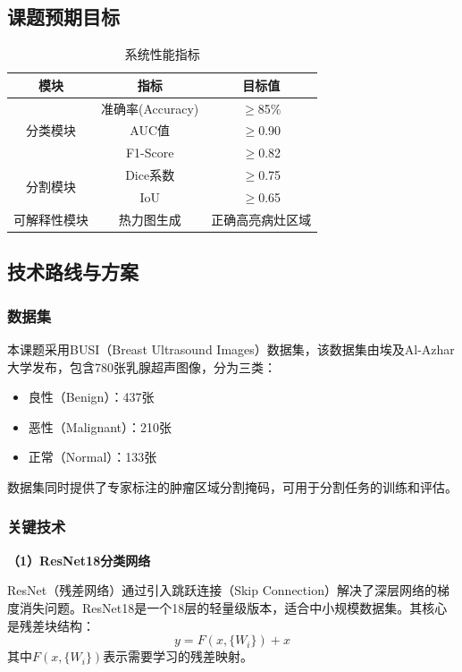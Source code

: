 \documentclass[supercite]{Hust-undergraduate-kaiti}
\theoremstyle{definition}
\begin{document}
\subsection{课题预期目标}

\begin{table}[htb]
\centering
\caption{系统性能指标}
\begin{tabular}{|c|c|c|}
\hline
\textbf{模块} & \textbf{指标} & \textbf{目标值} \\ \hline
\multirow{3}{*}{分类模块} & 准确率(Accuracy) & $\geq$85\% \\ \cline{2-3}
 & AUC值 & $\geq$0.90 \\ \cline{2-3}
 & F1-Score & $\geq$0.82 \\ \hline
\multirow{2}{*}{分割模块} & Dice系数 & $\geq$0.75 \\ \cline{2-3}
 & IoU & $\geq$0.65 \\ \hline
可解释性模块 & 热力图生成 & 正确高亮病灶区域 \\ \hline
\end{tabular}
\end{table}

\subsection{技术路线与方案}

\subsubsection{数据集}

本课题采用BUSI（Breast Ultrasound Images）数据集\cite{ref6}，该数据集由埃及Al-Azhar大学发布，包含780张乳腺超声图像，分为三类：
\begin{itemize}
    \item 良性（Benign）：437张
    \item 恶性（Malignant）：210张
    \item 正常（Normal）：133张
\end{itemize}

数据集同时提供了专家标注的肿瘤区域分割掩码，可用于分割任务的训练和评估。

\subsubsection{关键技术}

\textbf{（1）ResNet18分类网络}

ResNet（残差网络）通过引入跳跃连接（Skip Connection）解决了深层网络的梯度消失问题。ResNet18是一个18层的轻量级版本，适合中小规模数据集。其核心是残差块结构：
$$y = F(x, \{W_i\}) + x$$
其中$F(x, \{W_i\})$表示需要学习的残差映射。
\end{document}
